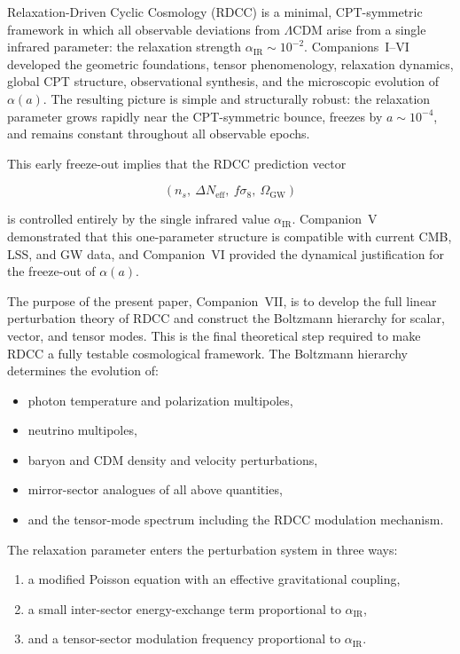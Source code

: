 \documentclass[11pt,a4paper]{article}
\begin{document}
Relaxation-Driven Cyclic Cosmology (RDCC) is a minimal, CPT-symmetric framework in
which all observable deviations from $\Lambda$CDM arise from a single infrared parameter:
the relaxation strength $\alpha_{\mathrm{IR}} \sim 10^{-2}$. Companions~I–VI developed the geometric
foundations, tensor phenomenology, relaxation dynamics, global CPT structure, observational
synthesis, and the microscopic evolution of $\alpha(a)$. The resulting picture is simple and
structurally robust: the relaxation parameter grows rapidly near the CPT-symmetric bounce,
freezes by $a \sim 10^{-4}$, and remains constant throughout all observable epochs.

This early freeze-out implies that the RDCC prediction vector


\[
    (n_s,\ \Delta N_{\mathrm{eff}},\ f\sigma_8,\ \Omega_{\mathrm{GW}})
\]


is controlled entirely by the single infrared value $\alpha_{\mathrm{IR}}$. Companion~V demonstrated
that this one-parameter structure is compatible with current CMB, LSS, and GW data, and
Companion~VI provided the dynamical justification for the freeze-out of $\alpha(a)$.

The purpose of the present paper, Companion~VII, is to develop the full linear perturbation
theory of RDCC and construct the Boltzmann hierarchy for scalar, vector, and tensor modes.
This is the final theoretical step required to make RDCC a fully testable cosmological
framework. The Boltzmann hierarchy determines the evolution of:
\begin{itemize}
    \item photon temperature and polarization multipoles,
    \item neutrino multipoles,
    \item baryon and CDM density and velocity perturbations,
    \item mirror-sector analogues of all above quantities,
    \item and the tensor-mode spectrum including the RDCC modulation mechanism.
\end{itemize}

The relaxation parameter enters the perturbation system in three ways:
\begin{enumerate}
    \item a modified Poisson equation with an effective gravitational coupling,
    \item a small inter-sector energy-exchange term proportional to $\alpha_{\mathrm{IR}}$,
    \item and a tensor-sector modulation frequency proportional to $\alpha_{\mathrm{IR}}$.
\end{enumerate}
\end{document}
